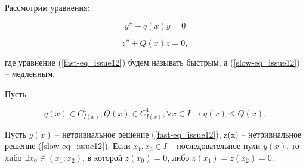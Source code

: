 \begin{theorem}

Рассмотрим уравнения:

\begin{equation}\label{fast-eq_issue12}
y'' + q(x) y = 0
\end{equation}

\begin{equation}\label{slow-eq_issue12}
z'' + Q(x)z = 0,
\end{equation}

где уравнение (\ref{fast-eq_issue12}) будем называть быстрым, а (\ref{slow-eq_issue12}) -- медленным.

Пусть 

\[q(x)\in C^1_{I(x)}, Q(x) \in C^1_{I(x)}, \forall x \in I \rightarrow q(x) \leq Q(x).\]

Пусть $y(x)$ -- нетривиальное решение (\ref{fast-eq_issue12}), z(x) -- нетривиальное решение (\ref{slow-eq_issue12}). Если $x_1, x_2 \in I$ -- последовательное нули $y(x)$, то либо $\exists x_0 \in (x_1;x_2)$, в которой $z(x_0) = 0$, либо $z(x_1) = z(x_2) = 0$.
\end{theorem}

